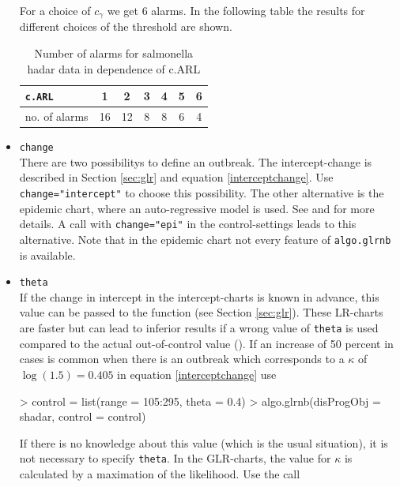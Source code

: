 \documentclass[a4paper,11pt]{article}
\begin{document}
\begin{itemize}
For a choice of $c_{\gamma}$ we get  6 alarms. In the following table the results for different choices of the threshold are shown.


\begin{table}[h]
\begin{center}
\caption{Number of alarms for salmonella hadar data in dependence of c.ARL}
\label{c.ARL}
\begin{tabular}{l|cccccc}
\verb+c.ARL+ & 1 & 2 & 3 & 4 & 5 & 6 \\
\hline
no. of alarms & 16 & 12 & 8 & 8 & 6 & 4
\end{tabular}
\end{center}
\end{table}





\item \verb+change+ \\
There are two possibilitys to define an outbreak. The intercept-change is described in Section \ref{sec:glr} and equation \ref{interceptchange}. Use \verb+change="intercept"+ to choose this possibility. The other alternative is the epidemic chart, where an auto-regressive model is used. See \citet{held2005} and \citet{hoehle2008} for more details. A call with \verb+change="epi"+ in the control-settings leads to this alternative. Note that in the epidemic chart not every feature of \verb+algo.glrnb+ is available. 

\item \verb+theta+ \\
If the change in intercept in the intercept-charts is known in advance, this value can be passed to the function (see Section \ref{sec:glr}). These LR-charts are faster but can lead to inferior results if a wrong value of \verb+theta+ is used compared to the actual out-of-control value (\citet{hoehle2008}). If  an increase of 50 percent in cases is common when there is an outbreak which corresponds to a $\kappa$ of $\log(1.5)=0.405$ in equation \ref{interceptchange} use

\begin{Schunk}
\begin{Sinput}
> control = list(range = 105:295, theta = 0.4)
> algo.glrnb(disProgObj = shadar, control = control)
\end{Sinput}
\end{Schunk}

If there is no knowledge about this value (which is the usual situation), it is not necessary to specify \verb+theta+. In the GLR-charts, the value for $\kappa$ is calculated by a maximation of the likelihood. Use the call   


\end{itemize}
\end{document}
